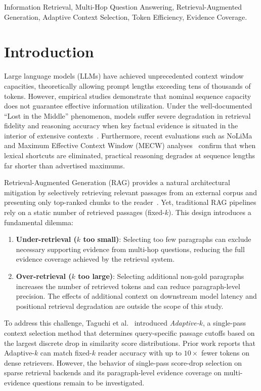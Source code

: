 \documentclass[conference]{IEEEtran}
\begin{document}
\begin{IEEEkeywords}
Information Retrieval, Multi-Hop Question Answering, Retrieval-Augmented Generation, Adaptive Context Selection, Token Efficiency, Evidence Coverage.
\end{IEEEkeywords}

\section{Introduction}
Large language models (LLMs) have achieved unprecedented context window capacities, theoretically allowing prompt lengths exceeding tens of thousands of tokens. However, empirical studies demonstrate that nominal sequence capacity does not guarantee effective information utilization. Under the well-documented ``Lost in the Middle'' phenomenon, models suffer severe degradation in retrieval fidelity and reasoning accuracy when key factual evidence is situated in the interior of extensive contexts~\cite{liu2024lost}. Furthermore, recent evaluations such as NoLiMa~\cite{modarressi2025nolima} and Maximum Effective Context Window (MECW) analyses~\cite{paulsen2026context} confirm that when lexical shortcuts are eliminated, practical reasoning degrades at sequence lengths far shorter than advertised maximums.

Retrieval-Augmented Generation (RAG) provides a natural architectural mitigation by selectively retrieving relevant passages from an external corpus and presenting only top-ranked chunks to the reader~\cite{lewis2020rag, zhao2024longrag}. Yet, traditional RAG pipelines rely on a static number of retrieved passages (fixed-$k$). This design introduces a fundamental dilemma:
\begin{enumerate}
    \item \textbf{Under-retrieval ($k$ too small)}: Selecting too few paragraphs can exclude necessary supporting evidence from multi-hop questions, reducing the full evidence coverage achieved by the retrieval system.
    \item \textbf{Over-retrieval ($k$ too large)}: Selecting additional non-gold paragraphs increases the number of retrieved tokens and can reduce paragraph-level precision. The effects of additional context on downstream model latency and positional retrieval degradation are outside the scope of this study.
\end{enumerate}

To address this challenge, Taguchi et al.~\cite{taguchi2025adaptivek} introduced \textit{Adaptive-$k$}, a single-pass context selection method that determines query-specific passage cutoffs based on the largest discrete drop in similarity score distributions. Prior work reports that Adaptive-$k$ can match fixed-$k$ reader accuracy with up to $10\times$ fewer tokens on dense retrievers. However, the behavior of single-pass score-drop selection on sparse retrieval backends and its paragraph-level evidence coverage on multi-evidence questions remain to be investigated.
\end{document}
